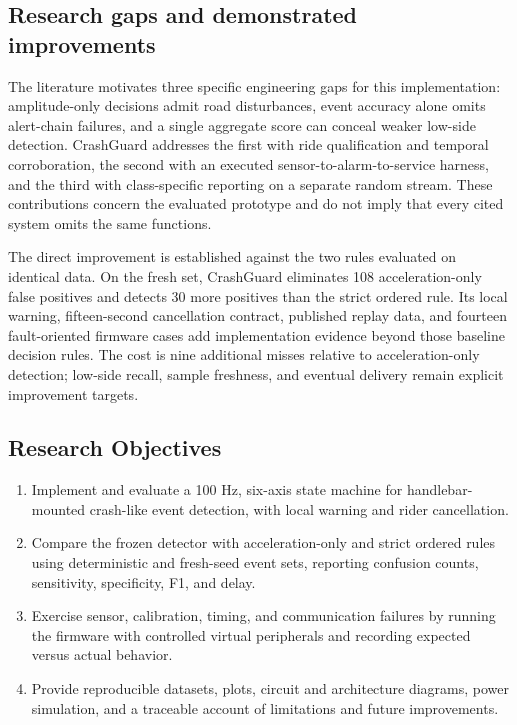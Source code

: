 \documentclass[10pt,a4paper]{article}
\begin{document}
\subsection{Research gaps and demonstrated improvements}
The literature motivates three specific engineering gaps for this implementation: amplitude-only decisions admit road disturbances, event accuracy alone omits alert-chain failures, and a single aggregate score can conceal weaker low-side detection. CrashGuard addresses the first with ride qualification and temporal corroboration, the second with an executed sensor-to-alarm-to-service harness, and the third with class-specific reporting on a separate random stream. These contributions concern the evaluated prototype and do not imply that every cited system omits the same functions.

The direct improvement is established against the two rules evaluated on identical data. On the fresh set, CrashGuard eliminates 108 acceleration-only false positives and detects 30 more positives than the strict ordered rule. Its local warning, fifteen-second cancellation contract, published replay data, and fourteen fault-oriented firmware cases add implementation evidence beyond those baseline decision rules. The cost is nine additional misses relative to acceleration-only detection; low-side recall, sample freshness, and eventual delivery remain explicit improvement targets.

\subsection{Research Objectives}
\begin{enumerate}
\item Implement and evaluate a 100 Hz, six-axis state machine for handlebar-mounted crash-like event detection, with local warning and rider cancellation.
\item Compare the frozen detector with acceleration-only and strict ordered rules using deterministic and fresh-seed event sets, reporting confusion counts, sensitivity, specificity, F1, and delay.
\item Exercise sensor, calibration, timing, and communication failures by running the firmware with controlled virtual peripherals and recording expected versus actual behavior.
\item Provide reproducible datasets, plots, circuit and architecture diagrams, power simulation, and a traceable account of limitations and future improvements.
\end{enumerate}
\end{document}

